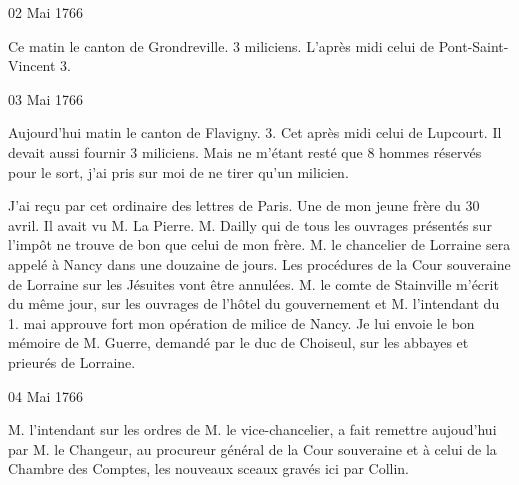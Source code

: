                      \begin{diary}{02 Mai 1766}{}

                         Ce matin le canton de Grondreville. 3
                           miliciens.
                           L'après midi celui de Pont-Saint-Vincent 3. \bigskip


                     \end{diary}

                     \begin{diary}{03 Mai 1766}{}

                         Aujourd'hui matin le canton de Flavigny. 3.
                           Cet après midi celui de
                              Lupcourt. Il devait
                           aussi fournir 3 miliciens. Mais ne m'étant resté
                           que 8 hommes réservés pour le sort, j'ai pris
                           sur moi de ne tirer qu'un milicien. \bigskip


                         J'ai reçu par cet ordinaire des
                           lettres de Paris.
                           Une de mon jeune frère du 30 avril. Il avait vu M.
                              La Pierre. M.
                              Dailly qui de tous les ouvrages présentés
                           sur l'impôt ne trouve de bon que celui
                              de mon frère.
                           M. le chancelier de Lorraine sera appelé à Nancy dans
                           une douzaine de jours. Les procédures de la Cour souveraine de Lorraine sur les Jésuites vont être annulées.
                           M. le comte de Stainville
                           m'écrit du même jour,
                           sur les ouvrages de l'hôtel
                              du gouvernement
                           et M. l'intendant du 1.
                              mai
                           approuve fort
                           mon opération de milice de Nancy. Je lui
                           envoie
                           le bon mémoire de M. Guerre,
                           demandé par le duc de Choiseul,
                           sur les
                           abbayes et prieurés de Lorraine. \bigskip


                     \end{diary}


                     \begin{diary}{04 Mai 1766}{}


                           M. l'intendant sur les ordres de
                              M. le
                              vice-chancelier, a fait remettre aujoud'hui
                           par M. le Changeur, au procureur général de la Cour souveraine
                           et à celui de la Chambre des Comptes, les nouveaux
                           sceaux gravés ici par Collin.
                        \bigskip


                     \end{diary}

